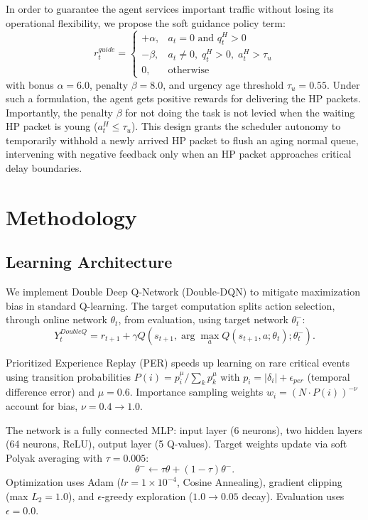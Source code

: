 \documentclass[runningheads,a4paper]{llncs}
\begin{document}
In order to guarantee the agent services important traffic without losing its
operational flexibility, we propose the soft guidance policy term:
\begin{equation}
r_t^{guide} =
\begin{cases}
+\alpha, & a_t = 0 \text{ and } q_t^H > 0\\
-\beta, & a_t \neq 0,\; q_t^H > 0,\; a_t^H > \tau_u\\
0, & \text{otherwise}
\end{cases}
\end{equation}
with bonus $\alpha = 6.0$, penalty $\beta = 8.0$, and urgency age threshold
$\tau_u = 0.55$. Under such a formulation, the agent gets positive rewards for
delivering the HP packets. Importantly, the penalty $\beta$ for not doing the
task is not levied when the waiting HP packet is young ($a_t^H \le \tau_u$).
This design grants the scheduler autonomy to temporarily withhold a newly
arrived HP packet to flush an aging normal queue, intervening with negative
feedback only when an HP packet approaches critical delay boundaries.

\section{Methodology}

\subsection{Learning Architecture}
We implement Double Deep Q-Network (Double-DQN) to mitigate maximization bias in
standard Q-learning. The target computation splits action selection, through
online network $\theta_t$, from evaluation, using target network $\theta_t^{-}$:
\begin{equation}
Y_t^{DoubleQ} = r_{t+1} + \gamma Q\left(s_{t+1}, \arg\max_a Q(s_{t+1}, a; \theta_t); \theta_t^{-}\right).
\end{equation}

Prioritized Experience Replay (PER) speeds up learning on rare critical
events using transition probabilities $P(i) = p_i^\mu / \sum_k p_k^\mu$ with
$p_i = |\delta_i| + \epsilon_{per}$ (temporal difference error) and $\mu = 0.6$.
Importance sampling weights $w_i = (N \cdot P(i))^{-\nu}$ account for bias,
$\nu = 0.4 \rightarrow 1.0$.

The network is a fully connected MLP: input layer (6 neurons), two hidden
layers (64 neurons, ReLU), output layer (5 Q-values). Target weights update via
soft Polyak averaging with $\tau = 0.005$:
\begin{equation}
\theta^- \leftarrow \tau \theta + (1-\tau)\theta^-.
\end{equation}
Optimization uses Adam ($lr = 1 \times 10^{-4}$, Cosine Annealing), gradient
clipping (max $L_2 = 1.0$), and $\epsilon$-greedy exploration ($1.0 \rightarrow 0.05$
decay). Evaluation uses $\epsilon = 0.0$.
\end{document}
